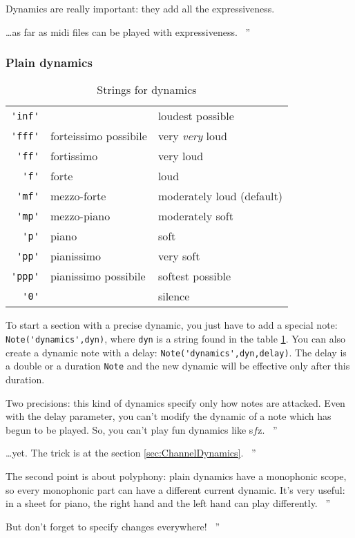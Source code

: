 \documentclass{article}
\newcommand{\note}{\lstinline!Note!\xspace}
\newcommand\sfz{s$\!f\!$z\xspace}
\newenvironment{meenv}{ \par \noindent \makebox[6em][r]{ \textcolor{mecolor}{Me}: `` --~}}{~''}
\newenvironment{myselfenv}{ \par \noindent \makebox[6em][r]{ \textcolor{myselfcolor}{Myself}: `` --~}}{~''}
\newcommand{ \me }[1]{%
\begin{meenv}%
	#1%
\end{meenv} }
\newcommand{ \myself }[1]{%
\begin{myselfenv}%
	#1%
\end{myselfenv} }
\begin{document}
Dynamics are really important: they add all the expressiveness.
\me{\dots as far as midi files can be played with expressiveness.}

\subsubsection{Plain dynamics}
\label{sec:PlainDynamics}

\begin{table}
	\centering
	\begin{tabular}{rll}
		\lstinline!'inf'! & & loudest possible \\
		\lstinline!'fff'! & forteissimo possibile & very \emph{very} loud \\
		\lstinline!'ff'! & fortissimo & very loud \\
		\lstinline!'f'! & forte & loud \\
		\lstinline!'mf'! & mezzo-forte & moderately loud (default) \\
		\lstinline!'mp'! & mezzo-piano & moderately soft \\
		\lstinline!'p'! & piano & soft \\
		\lstinline!'pp'! & pianissimo & very soft \\
		\lstinline!'ppp'! & pianissimo possibile & softest possible \\
		\lstinline!'0'! & & silence \\
	\end{tabular}
	\caption{Strings for dynamics}
	\label{tab:dynamics}
\end{table}

To start a section with a precise dynamic, you just have to add a special note: \lstinline!Note('dynamics',dyn)!, where \lstinline!dyn! is a string found in the table \ref{tab:dynamics}. You can also create a dynamic note with a delay: \lstinline!Note('dynamics',dyn,delay)!. The delay is a double or a duration \note and the new dynamic will be effective only after this duration.

\myself{Two precisions: this kind of dynamics specify only how notes are attacked. Even with the delay parameter, you can't modify the dynamic of a note which has begun to be played. So, you can't play fun dynamics like \sfz.}
\me{\dots yet. The trick is at the section \ref{sec:ChannelDynamics}.}
\myself{The second point is about polyphony: plain dynamics have a monophonic scope, so every monophonic part can have a different current dynamic. It's very useful: in a sheet for piano, the right hand and the left hand can play differently.}
\me{But don't forget to specify changes everywhere!}
\end{document}
